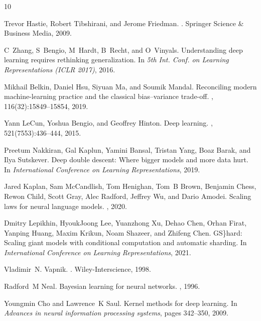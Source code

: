 \documentclass[11pt]{article}
\begin{document}
\begin{thebibliography}{10}

Trevor Hastie, Robert Tibshirani, and Jerome Friedman.
.
\newblock Springer Science \& Business Media, 2009.

C~Zhang, S~Bengio, M~Hardt, B~Recht, and O~Vinyals.
\newblock Understanding deep learning requires rethinking generalization.
\newblock In {\em 5th Int. Conf. on Learning Representations (ICLR 2017)},
  2016.

Mikhail Belkin, Daniel Hsu, Siyuan Ma, and Soumik Mandal.
\newblock Reconciling modern machine-learning practice and the classical
  bias--variance trade-off.
,
  116(32):15849--15854, 2019.

Yann LeCun, Yoshua Bengio, and Geoffrey Hinton.
\newblock Deep learning.
, 521(7553):436--444, 2015.

Preetum Nakkiran, Gal Kaplun, Yamini Bansal, Tristan Yang, Boaz Barak, and Ilya
  Sutskever.
\newblock Deep double descent: Where bigger models and more data hurt.
\newblock In {\em International Conference on Learning Representations}, 2019.

Jared Kaplan, Sam McCandlish, Tom Henighan, Tom~B Brown, Benjamin Chess, Rewon
  Child, Scott Gray, Alec Radford, Jeffrey Wu, and Dario Amodei.
\newblock Scaling laws for neural language models.
, 2020.

Dmitry Lepikhin, HyoukJoong Lee, Yuanzhong Xu, Dehao Chen, Orhan Firat, Yanping
  Huang, Maxim Krikun, Noam Shazeer, and Zhifeng Chen.
\newblock {\{}GS{\}}hard: Scaling giant models with conditional computation and
  automatic sharding.
\newblock In {\em International Conference on Learning Representations}, 2021.

Vladimir~N. Vapnik.
.
\newblock Wiley-Interscience, 1998.

Radford~M Neal.
\newblock Bayesian learning for neural networks.
, 1996.

Youngmin Cho and Lawrence~K Saul.
\newblock Kernel methods for deep learning.
\newblock In {\em Advances in neural information processing systems}, pages
  342--350, 2009.


\end{thebibliography}
\end{document}
